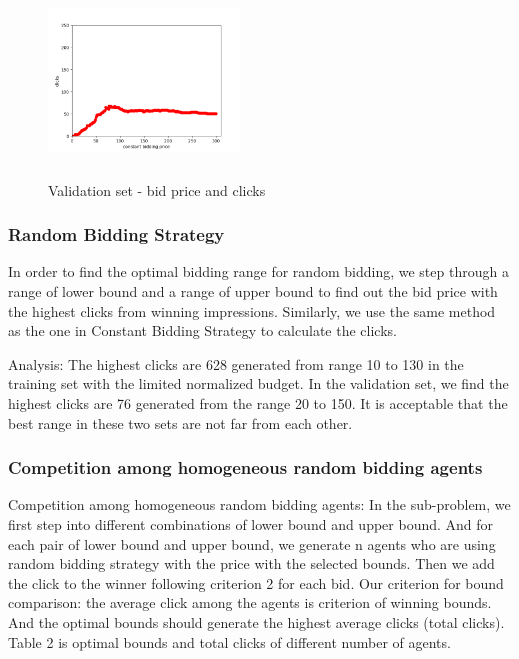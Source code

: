 \documentclass{sig-alternate-05-2015}
\begin{document}
\begin{figure}
\centering
\includegraphics[height=2in, width=2in]{images/constant_bidding_validation.png}
\caption{Validation set - bid price and clicks}
\end{figure}




\subsubsection{Random Bidding Strategy}
In order to find the optimal bidding range for random bidding, we step through a range of lower bound and a range of upper bound to find out the bid price with the highest clicks from winning impressions. Similarly, we use the same method as the one in Constant Bidding Strategy to calculate the clicks. 

Analysis: 
The highest clicks are 628 generated from range 10 to 130 in the training set with the limited normalized budget. In the validation set, we find the highest clicks are 76 generated from the range 20 to 150. It is acceptable that the best range in these two sets are not far from each other.


\subsubsection{Competition among homogeneous random bidding agents}

Competition among homogeneous random bidding agents:
In the sub-problem, we first step into different combinations of lower bound and upper bound. And for each pair of lower bound and upper bound, we generate n agents who are using random bidding strategy with the price with the selected bounds. Then we add the click to the winner following criterion 2 for each bid. 
Our criterion for bound comparison: the average click among the agents is criterion of winning bounds. And the optimal bounds should generate the highest average clicks (total clicks). Table 2 is  optimal bounds and total clicks of different number of agents. 
\end{document}

